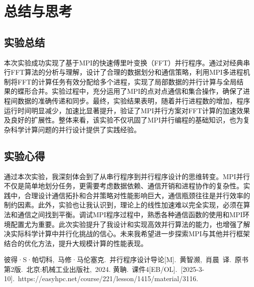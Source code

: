 \documentclass[a4paper, utf8]{ctexart}
\begin{document}
	\section{总结与思考}
	
	\subsection{实验总结}
	
	本次实验成功实现了基于MPI的快速傅里叶变换（FFT）并行程序。通过对经典串行FFT算法的分析与理解，设计了合理的数据划分和通信策略，利用MPI多进程机制将FFT的计算任务有效分配给多个进程，实现了局部数据的并行计算与全局结果的蝶形合并。实验过程中，充分运用了MPI的点对点通信和集合操作，确保了进程间数据的准确传递和同步。最终，实验结果表明，随着并行进程数的增加，程序运行时间明显减少，加速比显著提升，验证了MPI并行方案对FFT计算的加速效果及良好的扩展性。整体来看，该实验不仅巩固了MPI并行编程的基础知识，也为复杂科学计算问题的并行设计提供了实践经验。
	
	\subsection{实验心得}
	
	通过本次实验，我深刻体会到了从串行程序到并行程序设计的思维转变。MPI并行不仅是简单地划分任务，更需要考虑数据依赖、通信开销和进程协作的复杂性。实践中，合理设计通信拓扑和合并策略对性能影响巨大，通信瓶颈往往是并行效率的制约因素。此外，实验也让我认识到，理论上的线性加速难以完全实现，必须在算法和通信之间找到平衡。调试MPI程序过程中，熟悉各种通信函数的使用和MPI环境配置尤为重要。此次实验提升了我设计和实现高效并行算法的能力，也增强了解决实际科学计算中并行化挑战的信心。未来我希望进一步探索MPI与其他并行框架结合的优化方法，提升大规模计算的性能表现。
	
	\let\cleardoublepage\clearpage
	
	\begin{thebibliography}{99}  
		 彼得·S·帕切科,\ 马修·马伦塞克.\ 并行程序设计导论[M].\ 黄智濒,\ 肖晨\ 译.\ 原书第2版.\ 北京:机械工业出版社,\ 2024.
		 黄聃.\ 课件4[EB/OL].\ [2025-3-10].\ https://easyhpc.net/course/221/lesson/1415/material/3116.
	\end{thebibliography}
	
\end{document}
